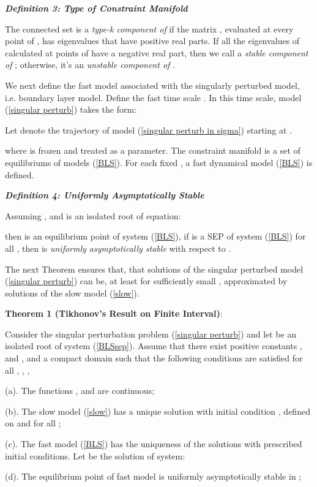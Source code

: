 \documentclass[journal]{IEEEtran}
\begin{document}
\noindent \textit{\textbf{Definition 3: Type of Constraint Manifold}}

The connected set  is a \textit{type-k component of } if the matrix , evaluated at every point of , has  eigenvalues that have positive real parts. If all the eigenvalues of  calculated at points of  have a negative real part, then we call  a \textit{stable component of }; otherwise, it's an \textit{unstable component of }.

We next define the fast model associated with the singularly perturbed model, i.e. boundary layer model. Define the fast time scale . In this time scale, model (\ref{singular perturb}) takes the form:

Let  denote the trajectory of model (\ref{singular perturb in sigma}) starting at .

where  is frozen and treated as a parameter. The constraint manifold  is a set of equilibriums of models (\ref{BLS}). For each fixed , a fast dynamical model (\ref{BLS}) is defined.

\noindent\textit{\textbf{Definition 4: Uniformly Asymptotically Stable}}

Assuming , and  is an isolated root of equation:

then  is an equilibrium point of system (\ref{BLS}), if  is a SEP of system (\ref{BLS}) for all , then  is \textit{uniformly asymptotically stable} with respect to .

The next Theorem ensures that, that solutions of the singular perturbed model (\ref{singular perturb}) can be, at least for sufficiently small , approximated by solutions of the slow model (\ref{slow}).


\noindent\textbf{Theorem 1 (Tikhonov's Result on Finite Interval)}\cite{Khalil:book}\cite{Lobry:article2}:

Consider the singular perturbation problem (\ref{singular perturb}) and let  be an isolated root of system (\ref{BLSsep}). Assume that there exist positive constants ,  and , and a compact domain  such that the following conditions are satisfied for all , , , 

(a). The functions ,  and  are continuous;

(b). The slow model (\ref{slow}) has a unique solution  with initial condition , defined on  and  for all ;

(c). The fast model (\ref{BLS}) has the uniqueness of the solutions with prescribed initial conditions. Let  be the solution of system:


(d). The equilibrium point  of fast model is uniformly asymptotically stable in ;
\end{document}
